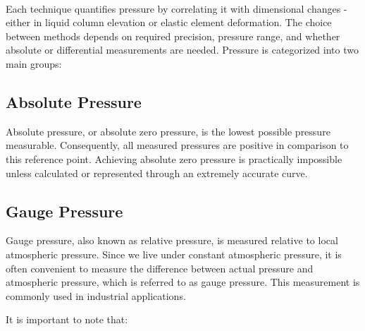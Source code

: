\documentclass{article}
\begin{document}
\begin{minipage}{1\textwidth}
\begin{minipage}{0.3\textwidth}
\vspace{0.2em}
\end{minipage}
\end{minipage}\\[0em]
Each technique quantifies pressure by correlating it with dimensional changes - either in liquid column elevation or elastic element deformation. The choice between methods depends on required precision, pressure range, and whether absolute or differential measurements are needed.
Pressure is categorized into two main groups:\\
\begin{minipage}{0.49\textwidth}
\subsection{Absolute Pressure}
Absolute pressure, or absolute zero pressure, is the lowest possible pressure measurable. Consequently, all measured pressures are positive in comparison to this reference point. Achieving absolute zero pressure is practically impossible unless calculated or represented through an extremely accurate curve.\end{minipage}\hfill
\begin{minipage}{0.49\textwidth}
\subsection{Gauge Pressure}
Gauge pressure, also known as relative pressure, is measured relative to local atmospheric pressure. Since we live under constant atmospheric pressure, it is often convenient to measure the difference between actual pressure and atmospheric pressure, which is referred to as gauge pressure. This measurement is commonly used in industrial applications.\end{minipage}
\newpage
\noindent
It is important to note that:\\[-5pt]
\end{document}
